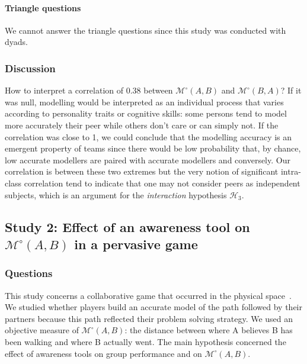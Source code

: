 \documentclass[twocolumn]{article}
\newcommand{\gModel}[2]{{$\mathcal{M}^{\circ}(#1, #2)$}}
\begin{document}
\paragraph{Triangle questions} We cannot answer the triangle questions since
this study was conducted with dyads.

\subsubsection*{Discussion}

How to interpret a correlation of 0.38 between \gModel{A}{B} and \gModel{B}{A}?
If it was null, modelling would be interpreted as an individual process that
varies according to personality traits or cognitive skills: some persons tend to
model more accurately their peer while others don't care or can simply not. If
the correlation was close to 1, we could conclude that the modelling accuracy is
an emergent property of teams since there would be low probability that, by
chance, low accurate modellers are paired with accurate modellers and
conversely. Our correlation is between these two extremes but the very notion of
significant intra-class correlation tend to indicate that one may not consider
peers as independent subjects, which is an argument for the \emph{interaction}
hypothesis $\mathcal{H}_{3}$. 





\subsection{Study 2: Effect of an awareness tool on \gModel{A}{B}  in a pervasive
game}

\subsubsection*{Questions}

This study concerns a collaborative game that occurred in the physical
space~\citep{nova2006underwhelming}. We studied whether players build an accurate
model of the path followed by their partners because this path reflected their
problem solving strategy. We used an objective measure of \gModel{A}{B}: the
distance between where A believes B has been walking and where B actually went.
The main hypothesis concerned the effect of awareness tools on group performance
and on \gModel{A}{B}. 
\end{document}
